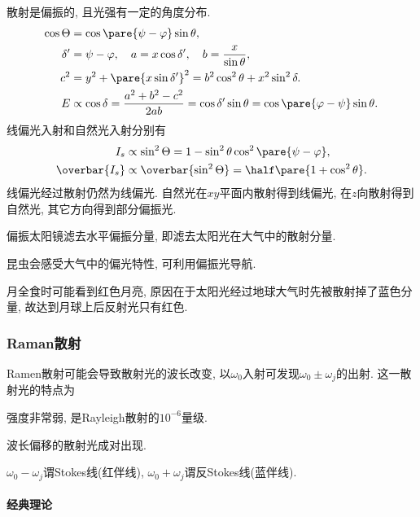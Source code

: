 \documentclass{ctexart}
\begin{document}
散射是偏振的, 且光强有一定的角度分布. 
\begin{align*}
    \cos\Theta &= \cos\pare{\psi - \varphi}\sin\theta, \\
    \delta' &= \psi - \varphi, \quad a = x\cos\delta', \quad b = \frac{x}{\sin \theta}, \\
    c^2 &= y^2 + \pare{x\sin\delta'}^2 = b^2\cos^2\theta + x^2\sin^2\delta. \\
    E &\propto \cos\delta = \frac{a^2+b^2-c^2}{2ab} = \cos\delta'\sin\theta = \cos\pare{\varphi - \psi}\sin\theta.
\end{align*}
线偏光入射和自然光入射分别有
\begin{align*}
    I_s & \propto \sin^2\Theta = 1-\sin^2\theta\cos^2\pare{\psi - \varphi}, \\
    \overbar{I_s} & \propto \overbar{\sin^2\Theta} = \half \pare{1+\cos^2\theta}.
\end{align*}
线偏光经过散射仍然为线偏光. 自然光在$xy$平面内散射得到线偏光, 在$z$向散射得到自然光, 其它方向得到部分偏振光. 
\begin{ex}
    偏振太阳镜滤去水平偏振分量, 即滤去太阳光在大气中的散射分量.
\end{ex}
\begin{ex}
    昆虫会感受大气中的偏光特性, 可利用偏振光导航.
\end{ex}
\begin{ex}
    月全食时可能看到红色月亮, 原因在于太阳光经过地球大气时先被散射掉了蓝色分量, 故达到月球上后反射光只有红色.
\end{ex}


\subsubsection{Raman散射} %
\label{ssub:raman散射}

Ramen散射可能会导致散射光的波长改变, 以$\omega_0$入射可发现$\omega_0 \pm \omega_j$的出射. 这一散射光的特点为
\begin{cenum}
    \item 强度非常弱, 是Rayleigh散射的$10^{-6}$量级.
    \item 波长偏移的散射光成对出现.
\end{cenum}
$\omega_0 - \omega_j$谓Stokes线(红伴线), $\omega_0 + \omega_j$谓反Stokes线(蓝伴线).

\paragraph{经典理论} %
\label{par:经典理论}
\end{document}
